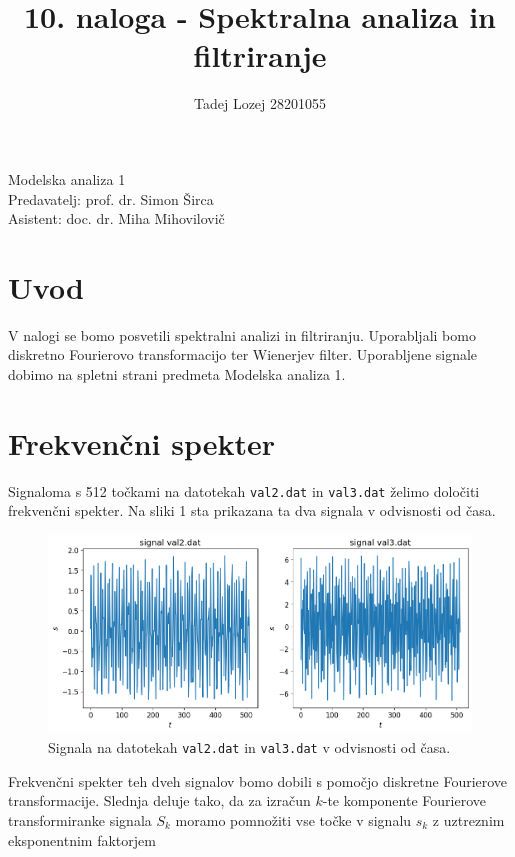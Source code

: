 \documentclass[slovene,11pt,a4paper]{article}
\begin{document}
\title{10. naloga - Spektralna analiza in filtriranje}
\author{Tadej Lozej 28201055}
\maketitle
\begin{center}
Modelska analiza 1 \\
\bigskip
Predavatelj: prof. dr. Simon Širca \\
Asistent: doc. dr. Miha Mihovilovič
\end{center}

\newpage

\tableofcontents

\newpage

\section{Uvod}


V nalogi se bomo posvetili spektralni analizi in filtriranju. Uporabljali bomo diskretno Fourierovo transformacijo ter Wienerjev filter. Uporabljene signale dobimo na spletni strani predmeta Modelska analiza 1.

\section{Frekvenčni spekter}

Signaloma s 512 točkami na datotekah \texttt{val2.dat} in \texttt{val3.dat} želimo določiti frekvenčni spekter. Na sliki 1 sta prikazana ta dva signala v odvisnosti od časa.

\begin{figure}[h!]
\centering
\includegraphics[width=12cm]{slika1.png}
\caption{Signala na datotekah \texttt{val2.dat} in \texttt{val3.dat} v odvisnosti od časa.}
\end{figure}

Frekvenčni spekter teh dveh signalov bomo dobili s pomočjo diskretne Fourierove transformacije. Slednja deluje tako, da za izračun $k$-te komponente Fourierove transformiranke signala $S_k$ moramo pomnožiti vse točke v signalu $s_k$ z uztreznim eksponentnim faktorjem
\end{document}
